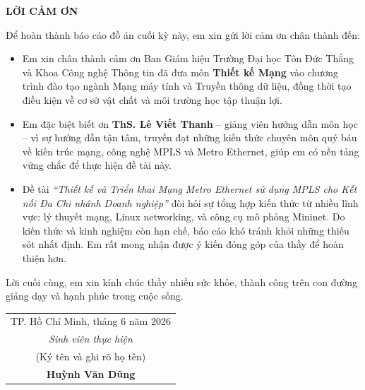 \begin{center}
\pagestyle{empty}
{\Large \textbf{LỜI CẢM ƠN}}
\end{center}

\vspace{0.5cm}
Để hoàn thành báo cáo đồ án cuối kỳ này, em xin gửi lời cảm ơn chân thành đến:

\begin{itemize}
    \item Em xin chân thành cảm ơn Ban Giám hiệu Trường Đại học Tôn Đức Thắng và Khoa Công nghệ Thông tin đã đưa môn \textbf{Thiết kế Mạng} vào chương trình đào tạo ngành Mạng máy tính và Truyền thông dữ liệu, đồng thời tạo điều kiện về cơ sở vật chất và môi trường học tập thuận lợi.

    \item Em đặc biệt biết ơn \textbf{ThS. Lê Viết Thanh} -- giảng viên hướng dẫn môn học -- vì sự hướng dẫn tận tâm, truyền đạt những kiến thức chuyên môn quý báu về kiến trúc mạng, công nghệ MPLS và Metro Ethernet, giúp em có nền tảng vững chắc để thực hiện đề tài này.

    \item Đề tài \textit{``Thiết kế và Triển khai Mạng Metro Ethernet sử dụng MPLS cho Kết nối Đa Chi nhánh Doanh nghiệp''} đòi hỏi sự tổng hợp kiến thức từ nhiều lĩnh vực: lý thuyết mạng, Linux networking, và công cụ mô phỏng Mininet. Do kiến thức và kinh nghiệm còn hạn chế, báo cáo khó tránh khỏi những thiếu sót nhất định. Em rất mong nhận được ý kiến đóng góp của thầy để hoàn thiện hơn.
\end{itemize}

Lời cuối cùng, em xin kính chúc thầy nhiều sức khỏe, thành công trên con đường giảng dạy và hạnh phúc trong cuộc sống.

\vspace{2cm}

\begin{flushright}
\begin{tabular}{c}
    \multicolumn{1}{r}{TP. Hồ Chí Minh, tháng 6 năm 2026}\\[0.5cm]
    \textit{Sinh viên thực hiện} \\
    (Ký tên và ghi rõ họ tên) \\[2cm]
    \textbf{Huỳnh Văn Dũng} \\
\end{tabular}
\end{flushright}
